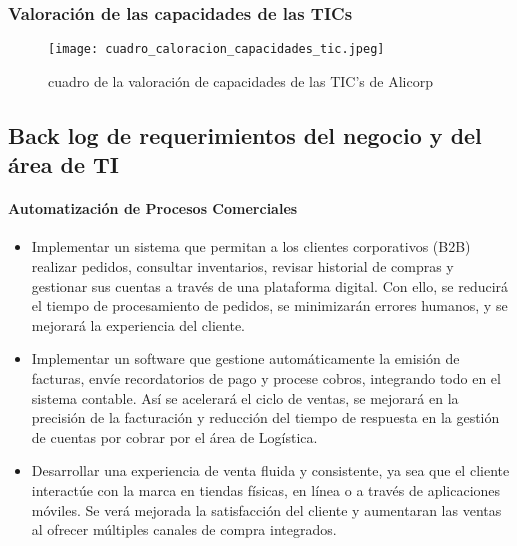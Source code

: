    \subsubsection{Valoración de las capacidades de las TICs}
        \begin{figure}[!ht]
            \centering
            \texttt{[image: cuadro\_caloracion\_capacidades\_tic.jpeg]}
            \caption{cuadro de la valoración de capacidades de las TIC's de Alicorp}
        \end{figure}

\subsection{Back log de requerimientos del negocio y del área de TI}

    \paragraph*{Automatización de Procesos Comerciales}
        \begin{itemize}
            \item Implementar un sistema que permitan a los clientes corporativos (B2B) realizar pedidos, consultar inventarios, revisar historial de compras y gestionar sus cuentas a través de una plataforma digital. Con ello, se reducirá el tiempo de procesamiento de pedidos, se minimizarán errores humanos, y se mejorará la experiencia del cliente.
            \item Implementar un software que gestione automáticamente la emisión de facturas, envíe recordatorios de pago y procese cobros, integrando todo en el sistema contable. Así se acelerará el ciclo de ventas, se mejorará en la precisión de la facturación y reducción del tiempo de respuesta en la gestión de cuentas por cobrar por el área de Logística.
            \item Desarrollar una experiencia de venta fluida y consistente, ya sea que el cliente interactúe con la marca en tiendas físicas, en línea o a través de aplicaciones móviles. Se verá mejorada la satisfacción del cliente y aumentaran las ventas al ofrecer múltiples canales de compra integrados.
        \end{itemize}
